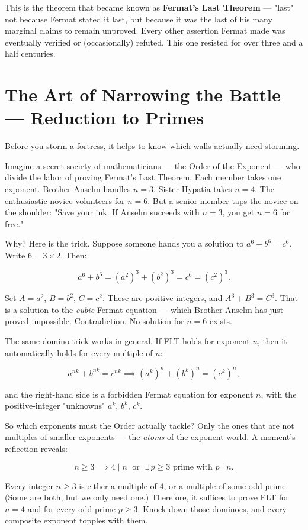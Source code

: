 \documentclass[11pt,twoside,openright]{book}
\theoremstyle{definition}
\theoremstyle{remark}
\begin{document}
This is the theorem that became known as \textbf{Fermat's Last Theorem} --- "last" not because Fermat stated it last, but because it was the last of his many marginal claims to remain unproved. Every other assertion Fermat made was eventually verified or (occasionally) refuted. This one resisted for over three and a half centuries.


\section{The Art of Narrowing the Battle --- Reduction to Primes}

Before you storm a fortress, it helps to know which walls actually need storming.

Imagine a secret society of mathematicians --- the Order of the Exponent --- who divide the labor of proving Fermat's Last Theorem. Each member takes one exponent. Brother Anselm handles $n = 3$. Sister Hypatia takes $n = 4$. The enthusiastic novice volunteers for $n = 6$. But a senior member taps the novice on the shoulder: "Save your ink. If Anselm succeeds with $n = 3$, you get $n = 6$ for free."

Why? Here is the trick. Suppose someone hands you a solution to $a^6 + b^6 = c^6$. Write $6 = 3 \times 2$. Then:

\[a^6 + b^6 = (a^2)^3 + (b^2)^3 = c^6 = (c^2)^3.\]

Set $A = a^2$, $B = b^2$, $C = c^2$. These are positive integers, and $A^3 + B^3 = C^3$. That is a solution to the \textit{cubic} Fermat equation --- which Brother Anselm has just proved impossible. Contradiction. No solution for $n = 6$ exists.

The same domino trick works in general. If FLT holds for exponent $n$, then it automatically holds for every multiple of $n$:

\[a^{nk} + b^{nk} = c^{nk} \implies (a^k)^n + (b^k)^n = (c^k)^n,\]

and the right-hand side is a forbidden Fermat equation for exponent $n$, with the positive-integer "unknowns" $a^k$, $b^k$, $c^k$.

So which exponents must the Order actually tackle? Only the ones that are not multiples of smaller exponents --- the \textit{atoms} of the exponent world. A moment's reflection reveals:

\[n \ge 3 \implies 4 \mid n \;\text{ or }\; \exists\, p \ge 3 \text{ prime with } p \mid n.\]

Every integer $n \ge 3$ is either a multiple of $4$, or a multiple of some odd prime. (Some are both, but we only need one.) Therefore, it suffices to prove FLT for $n = 4$ and for every odd prime $p \ge 3$. Knock down those dominoes, and every composite exponent topples with them.
\end{document}
